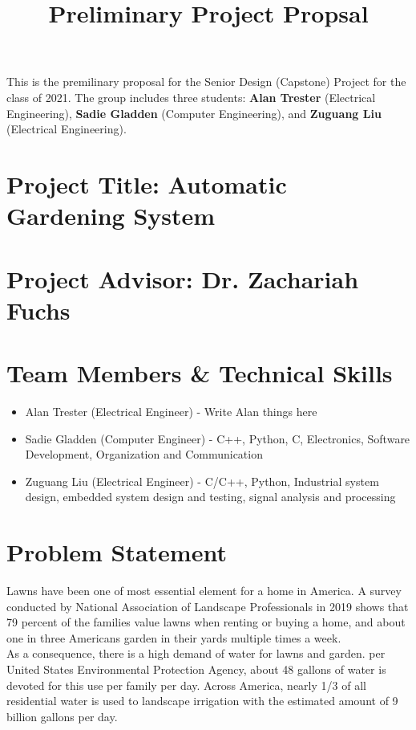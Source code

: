 \documentclass[]{article}
\title{Preliminary Project Propsal}
\begin{document}
\maketitle

This is the premilinary proposal for the Senior Design (Capstone) Project for the class of 2021. The group includes three students: \textbf{Alan Trester} (Electrical Engineering), \textbf{Sadie Gladden} (Computer Engineering), and \textbf{Zuguang Liu} (Electrical Engineering).


\section*{Project Title: Automatic Gardening System}

	
	
\section*{Project Advisor: Dr. Zachariah Fuchs}


\section*{Team Members \& Technical Skills}
\begin{itemize}
	\item Alan Trester (Electrical Engineer) - Write Alan things here
	\item Sadie Gladden (Computer Engineer) - C++, Python, C, Electronics, Software Development, Organization and Communication 
	\item Zuguang Liu (Electrical Engineer) - C/C++, Python, Industrial system design, embedded system design and testing, signal analysis and processing
\end{itemize}

\section*{Problem Statement}
	Lawns have been one of most essential element for a home in America. A survey conducted by National Association of Landscape Professionals in 2019 shows that 79 percent of the families value lawns when renting or buying a home, and about one in three Americans garden in their yards multiple times a week\cite{noauthor_new_2019}. \\
	
	As a consequence, there is a high demand of water for lawns and garden. per United States Environmental Protection Agency, about 48 gallons of water is devoted for this use per family per day. Across America, nearly 1/3 of all residential water is used to landscape irrigation with the estimated amount of 9 billion gallons per day\cite{epa_outdoor_nodate}. \\
	
\end{document}
